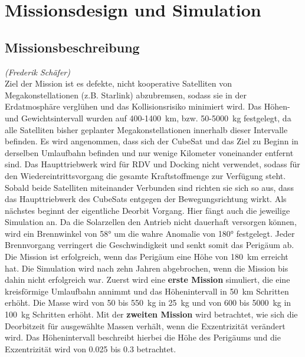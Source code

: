 \chapter{Missionsdesign und Simulation}


\section{Missionsbeschreibung}
\hfill\emph{(Frederik Schäfer)}\\
Ziel der Mission ist es defekte, nicht kooperative Satelliten von Megakonstellationen (z.B. Starlink) abzubremsen, sodass sie in der Erdatmosphäre verglühen und das Kollisionsrisiko minimiert wird. Das Höhen- und Gewichtsintervall wurden auf \num{400}-\SI{1400}{\kilo\metre}, bzw. \num{50}-\SI{5000}{\kilogram} festgelegt, da alle Satelliten bisher geplanter Megakonstellationen innerhalb dieser Intervalle befinden.
Es wird angenommen, dass sich der CubeSat und das Ziel zu Beginn in derselben Umlaufbahn befinden und nur wenige Kilometer voneinander entfernt sind. Das Haupttriebwerk wird für RDV und Docking nicht verwendet, sodass für den Wiedereintrittsvorgang die gesamte Kraftstoffmenge zur Verfügung steht. Sobald beide Satelliten miteinander Verbunden sind richten sie sich so aus, dass das Haupttriebwerk des CubeSats entgegen der Bewegungsrichtung wirkt. Als nächstes beginnt der eigentliche Deorbit Vorgang. Hier fängt auch die jeweilige Simulation an. Da die Solarzellen den Antrieb nicht dauerhaft versorgen können, wird ein Brennwinkel von \num{58}° um die wahre Anomalie von \num{180}° festgelegt.
Jeder Brennvorgang verringert die Geschwindigkeit und senkt somit das Perigäum ab. Die Mission ist erfolgreich, wenn das Perigäum eine Höhe von \SI{180}{\kilo\metre} erreicht hat. Die Simulation wird nach zehn Jahren abgebrochen, wenn die Mission bis dahin nicht erfolgreich war. 
Zuerst wird eine \textbf{erste Mission} simuliert, die eine kreisförmige Umlaufbahn annimmt und das Höhenintervall in \SI{50}{\kilo\metre} Schritten erhöht. Die Masse wird von \num{50} bis \SI{550}{\kilogram} in \SI{25}{\kilogram} und von \num{600} bis \SI{5000}{\kilogram} in \SI{100}{\kilogram} Schritten erhöht.
Mit der \textbf{zweiten Mission} wird betrachtet, wie sich die Deorbitzeit für ausgewählte Massen verhält, wenn die Exzentrizität verändert wird. Das Höhenintervall beschreibt hierbei die Höhe des Perigäums und die Exzentrizität wird von \num{0.025} bis \num{0.3} betrachtet.
	
